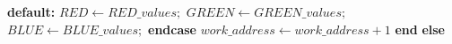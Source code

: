 \begin{algorithm}[H]
\begin{algorithmic}[1]
		\State \hspace{\algorithmicindent}\hspace{\algorithmicindent}\hspace{\algorithmicindent}\hspace{\algorithmicindent}
		\State \hspace{\algorithmicindent}\hspace{\algorithmicindent}\hspace{\algorithmicindent}\hspace{\algorithmicindent}\textbf{default:} 
		\State \hspace{\algorithmicindent}\hspace{\algorithmicindent}\hspace{\algorithmicindent}\hspace{\algorithmicindent}\hspace{\algorithmicindent}$RED \gets RED\_values;$
		\State \hspace{\algorithmicindent}\hspace{\algorithmicindent}\hspace{\algorithmicindent}\hspace{\algorithmicindent}\hspace{\algorithmicindent}$GREEN \gets GREEN\_values;$
		\State \hspace{\algorithmicindent}\hspace{\algorithmicindent}\hspace{\algorithmicindent}\hspace{\algorithmicindent}\hspace{\algorithmicindent}$BLUE \gets BLUE\_values;$
		\State \hspace{\algorithmicindent}\hspace{\algorithmicindent}\hspace{\algorithmicindent}\hspace{\algorithmicindent}\textbf{endcase}
		\State \hspace{\algorithmicindent}\hspace{\algorithmicindent}\hspace{\algorithmicindent}\hspace{\algorithmicindent}$work\_address \gets work\_address + 1$
		\State \hspace{\algorithmicindent}\hspace{\algorithmicindent}\hspace{\algorithmicindent}\textbf{end}
		\State \hspace{\algorithmicindent}\hspace{\algorithmicindent}\hspace{\algorithmicindent}\textbf{else}

\end{algorithmic}
\end{algorithm}
